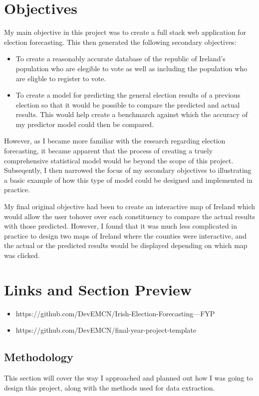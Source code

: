 \section{Objectives}
My main objective in this project was to create a full stack web application for election forecasting. This then generated the following secondary objectives:
\begin{itemize}
	\item To create a reasonably accurate database of the republic of Ireland’s population who are elegible to vote as well as including the population who are eligble to register to vote.
	\item To create a model for predicting the general election results of a previous election so that it would be possible to compare the predicted and actual results. This would help create a benchmarch against which the accuracy of my predictor model could then be compared.
\end{itemize}

However, as I became more familiar with the research regarding election forecasting, it became apparent that the process of creating a truely comprehensive statistical model would be beyond the scope of this project.  Subseqently, I then narrowed the focus of my secondary objectives to illustrating a basic example of how this type of model could be designed and implemented in practice. 

My final original objective had been to create an interactive map of Ireland which would allow the user tohover over each constituency to compare the actual results with those predicted.  However, I  found that it was much less complicated in practice to design two maps of Ireland where the counties were interactive, and the actual or the predicted results would be displayed depending on which map was clicked. 

\section{Links and Section Preview}
\begin{itemize}
	\item https://github.com/DevEMCN/Irish-Election-Forecasting---FYP
	\item https://github.com/DevEMCN/final-year-project-template
\end{itemize}
\subsection{Methodology}
This section will cover the way I approached and planned out how I was going to design this project, along with the methods used for data extraction. 
